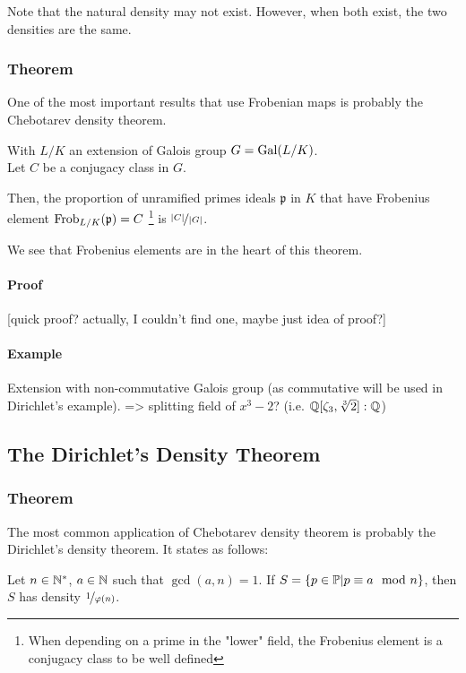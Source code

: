 Note that the natural density may not exist.
However, when both exist, the two densities are the same.



\subsubsection{Theorem}
One of the most important results that use Frobenian maps is probably the Chebotarev density theorem.
\begin{theorem}
	With $L/K$ an extension of Galois group $G=\text{Gal}(L/K)$.\\
	Let $C$ be a conjugacy class in $G$.
	
	Then, the proportion of unramified primes ideals $\mathfrak{p}$ in $K$ that have Frobenius element $\text{Frob}_{L/K}(\mathfrak{p})=C$ \footnote{When depending on a prime in the "lower" field, the Frobenius element is a conjugacy class to be well defined} is $\nicefrac{|C|}{|G|}$.
\end{theorem}
We see that Frobenius elements are in the heart of this theorem.

\paragraph{Proof}
[quick proof? actually, I couldn't find one, maybe just idea of proof?]

\paragraph{Example}
Extension with non-commutative Galois group (as commutative will be used in Dirichlet's example).
=> splitting field of $x^3-2$? (i.e. $\mathbb{Q}[\zeta_3, \sqrt[3]{2}]:\mathbb{Q}$)



\subsection{The Dirichlet's Density Theorem}
\subsubsection{Theorem}
The most common application of Chebotarev density theorem is probably the Dirichlet's density theorem.
It states as follows:
\begin{theorem}
	Let $n \in \mathbb{N}^*$, $a \in \mathbb{N}$ such that $\gcd(a,n) = 1$. 
	If $S = \{ p \in \mathbb{P} | p \equiv a \mod n \}$, then $S$ has density $\nicefrac{1}{\varphi(n)}$.
\end{theorem}

